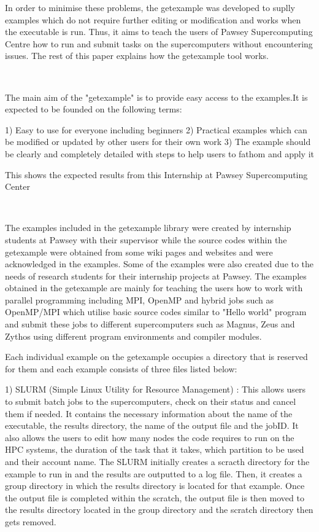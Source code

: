 \begin{Document}
{\begin{Introduction}
In order to minimise these problems, the getexample was developed to suplly examples which do not require further editing or modification and works
when the executable is run. Thus, it aims to teach the users of Pawsey Supercomputing Centre how to run and submit tasks on the supercomputers without 
encountering issues. The rest of this paper explains how the getexample tool works.   


\end{Introduction}
\
\

The main aim of the "getexample" is to provide easy access to the examples.It is expected to be founded on the following terms:

1) Easy to use for everyone including beginners
2) Practical examples which can be modified or updated by other users for their own work
3) The example should be clearly and completely detailed with steps to help users to fathom and apply it

\Section{Scope}
\begin{scope}

This shows the expected results from this Internship at Pawsey Supercomputing Center
\
\



\end{scope}
\

The examples included in the getexample library were created by internship students at Pawsey with their supervisor while the source codes within the
getexample were obtained from some wiki pages and websites and were acknowledged in the examples. Some of the examples were also created due to the
needs of research students for their internship projects at Pawsey. The examples obtained in the getexample are mainly for teaching the users how to work
with parallel programming including MPI, OpenMP and hybrid jobs such as OpenMP/MPI which utilise basic source codes similar to "Hello world" program and
submit these jobs to different supercomputers such as Magnus, Zeus and Zythos using different program environments and compiler modules. 

Each individual example on the getexample occupies a directory that is reserved for them and each example consists of three files listed below:
    
1) SLURM (Simple Linux Utility for Resource Management) : This allows users to submit batch jobs to the supercomputers, check on their status and cancel 
them if needed. It contains the necessary information about the name of the executable, the results directory, the name of the output file and the jobID. 
It also allows the users to edit how many nodes the code requires to run on the HPC systems, the duration of the task that it takes, which partition to
be used and their account name. The SLURM initially creates a scracth directory for the example to run in and the results are outputted to a log file. 
Then, it creates a group directory in which the results directory is located for that example. Once the output file is completed within the 
scratch, the output file is then moved to the results directory located in the group directory and the scratch directory then gets removed.

}
\end{Document}
